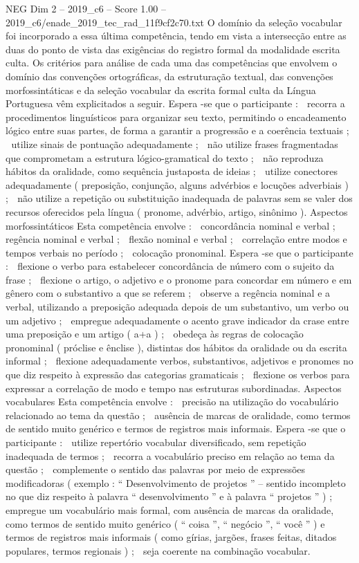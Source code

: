 \begin{textsample}{NEG Dim 2 – 2019\_c6 – Score 1.00 – 2019\_c6/enade\_2019\_tec\_rad\_11f9cf2c70.txt}
O domínio da seleção vocabular foi incorporado a essa última competência, tendo em vista a intersecção entre as duas do ponto de vista das exigências do registro formal da modalidade escrita culta.
Os critérios para análise de cada uma das competências que envolvem o domínio das convenções ortográficas, da estruturação textual, das convenções morfossintáticas e da seleção vocabular da escrita formal culta da Língua Portuguesa vêm explicitados a seguir.
Espera -se que o participante :  recorra a procedimentos linguísticos para organizar seu texto, permitindo o encadeamento lógico entre suas partes, de forma a garantir a progressão e a coerência textuais ;  utilize sinais de pontuação adequadamente ;  não utilize frases fragmentadas que comprometam a estrutura lógico-gramatical do texto ;  não reproduza hábitos da oralidade, como sequência justaposta de ideias ;  utilize conectores adequadamente ( preposição, conjunção, alguns advérbios e locuções adverbiais ) ;  não utilize a repetição ou substituição inadequada de palavras sem se valer dos recursos oferecidos pela língua ( pronome, advérbio, artigo, sinônimo ).
Aspectos morfossintáticos Esta competência envolve :  concordância nominal e verbal ;  regência nominal e verbal ;  flexão nominal e verbal ;  correlação entre modos e tempos verbais no período ;  colocação pronominal.
Espera -se que o participante :  flexione o verbo para estabelecer concordância de número com o sujeito da frase ;  flexione o artigo, o adjetivo e o pronome para concordar em número e em gênero com o substantivo a que se referem ;  observe a regência nominal e a verbal, utilizando a preposição adequada depois de um substantivo, um verbo ou um adjetivo ;  empregue adequadamente o acento grave indicador da crase entre uma preposição e um artigo ( a+a ) ;  obedeça às regras de colocação pronominal ( próclise e ênclise ), distintas dos hábitos da oralidade ou da escrita informal ;  flexione adequadamente verbos, substantivos, adjetivos e pronomes no que diz respeito à expressão das categorias gramaticais ;  flexione os verbos para expressar a correlação de modo e tempo nas estruturas subordinadas.
Aspectos vocabulares Esta competência envolve :  precisão na utilização do vocabulário relacionado ao tema da questão ;  ausência de marcas de oralidade, como termos de sentido muito genérico e termos de registros mais informais.
Espera -se que o participante :  utilize repertório vocabular diversificado, sem repetição inadequada de termos ;  recorra a vocabulário preciso em relação ao tema da questão ;  complemente o sentido das palavras por meio de expressões modificadoras ( exemplo : “ Desenvolvimento de projetos ” – sentido incompleto no que diz respeito à palavra “ desenvolvimento ” e à palavra “ projetos ” ) ;  empregue um vocabulário mais formal, com ausência de marcas da oralidade, como termos de sentido muito genérico ( “ coisa ”, “ negócio ”, “ você ” ) e termos de registros mais informais ( como gírias, jargões, frases feitas, ditados populares, termos regionais ) ;  seja coerente na combinação vocabular.

\end{textsample}
